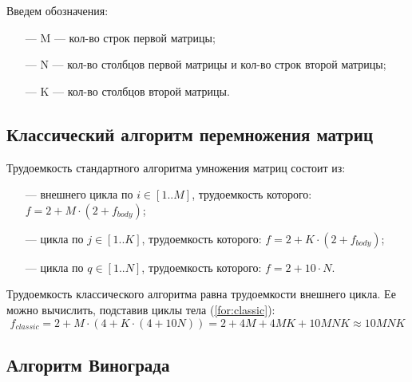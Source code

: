 Введем обозначения:
\begin{itemize}
	\item[---] M --- кол-во строк первой матрицы;
	\item[---] N --- кол-во столбцов первой матрицы и кол-во строк второй матрицы;
	\item[---] K --- кол-во столбцов второй матрицы.
\end{itemize}

\subsection{Классический алгоритм перемножения матриц}

Трудоемкость стандартного алгоритма умножения матриц состоит из:

\begin{itemize}
	\item[---] внешнего цикла по $i \in [1..M]$, трудоемкость которого: $f = 2 + M \cdot (2 + f_{body})$;
	\item[---] цикла по $j \in [1..K]$, трудоемкость которого: $f = 2 + K \cdot (2 + f_{body})$;
	\item[---] цикла по $q \in [1..N]$, трудоемкость которого: $f = 2 + 10 \cdot N$.
\end{itemize}

Трудоемкость классического алгоритма равна трудоемкости внешнего цикла.
Ее можно вычислить, подставив циклы тела (\ref{for:classic}):
\begin{equation}
	\label{for:classic}
	f_{classic} = 2 + M \cdot (4 + K \cdot (4 + 10N)) = 2 + 4M + 4MK + 10MNK \approx 10MNK
\end{equation}

\subsection{Алгоритм Винограда}

